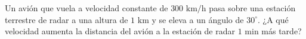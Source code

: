 \item Un avión que vuela a velocidad constante de $300 \text{ km/h}$ pasa sobre una estación terrestre de radar a una altura de $1 \text{ km}$ y se eleva a un ángulo de $30^\circ$. ¿A qué velocidad aumenta la distancia del avión a la estación de radar $1 \text{ min}$ más tarde?
